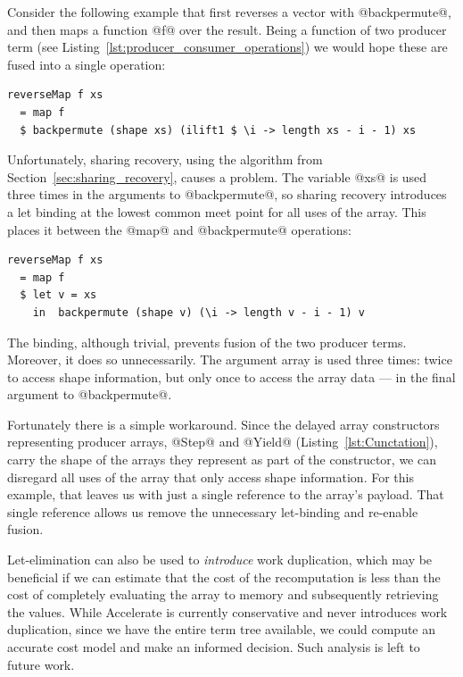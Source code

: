 Consider the following example that first reverses a vector with @backpermute@,
and then maps a function @f@ over the result. Being a function of two producer
term (see Listing~\ref{lst:producer_consumer_operations}) we would hope these
are fused into a single operation:%
%
\begin{lstlisting}[style=haskell]
reverseMap f xs
  = map f
  $ backpermute (shape xs) (ilift1 $ \i -> length xs - i - 1) xs
\end{lstlisting}
%
Unfortunately, sharing recovery, using the algorithm from
Section~\ref{sec:sharing_recovery}, causes a problem. The variable @xs@
is used three times in the arguments to @backpermute@, so sharing recovery
introduces a let binding at the lowest common meet point for all uses of the
array. This places it between the @map@ and @backpermute@ operations:
%
\begin{lstlisting}[style=haskell]
reverseMap f xs
  = map f
  $ let v = xs
    in  backpermute (shape v) (\i -> length v - i - 1) v
\end{lstlisting}
%
The binding, although trivial, prevents fusion of the two producer terms.
Moreover, it does so unnecessarily. The argument array is used three times:
twice to access shape information, but only once to access the array data ---
in the final argument to @backpermute@.

Fortunately there is a simple workaround. Since the delayed array constructors
representing producer arrays, @Step@ and @Yield@ (Listing~\ref{lst:Cunctation}),
carry the shape of the arrays they represent as part of the constructor, we can
disregard all uses of the array that only access shape information. For this
example, that leaves us with just a single reference to the array's payload.
That single reference allows us remove the unnecessary let-binding and re-enable
fusion.

Let-elimination can also be used to \emph{introduce} work duplication, which may
be beneficial if we can estimate that the cost of the recomputation is less than
the cost of completely evaluating the array to memory and subsequently
retrieving the values. While Accelerate is currently conservative and never
introduces work duplication, since we have the entire term tree available, we
could compute an accurate cost model and make an informed decision. Such
analysis is left to future work.


